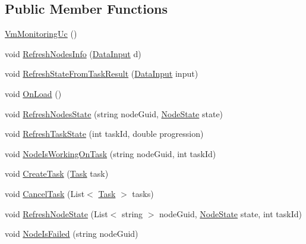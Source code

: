 \subsection*{Public Member Functions}
\begin{DoxyCompactItemize}
\item 
\hyperlink{class_node_net_1_1_g_u_i_1_1_view_model_1_1_vm_monitoring_uc_af7d7dfd28786e8cf72b26656503ae4c6}{Vm\+Monitoring\+Uc} ()
\item 
void \hyperlink{class_node_net_1_1_g_u_i_1_1_view_model_1_1_vm_monitoring_uc_aa3a412d8d562a772eb6dd09137a8b5c1}{Refresh\+Nodes\+Info} (\hyperlink{class_node_net_1_1_data_1_1_data_input}{Data\+Input} d)
\item 
void \hyperlink{class_node_net_1_1_g_u_i_1_1_view_model_1_1_vm_monitoring_uc_a72c7b887a58e93877aff75a014aca453}{Refresh\+State\+From\+Task\+Result} (\hyperlink{class_node_net_1_1_data_1_1_data_input}{Data\+Input} input)
\item 
void \hyperlink{class_node_net_1_1_g_u_i_1_1_view_model_1_1_vm_monitoring_uc_a42957d244bc7d5800bb140c6d202b43c}{On\+Load} ()
\item 
void \hyperlink{class_node_net_1_1_g_u_i_1_1_view_model_1_1_vm_monitoring_uc_a318859b0fed0360b2f0e2637c5da120f}{Refresh\+Nodes\+State} (string node\+Guid, \hyperlink{namespace_node_net_1_1_network_1_1_states_a0c130cd0043f8c509dddba2cf1fd2f36}{Node\+State} state)
\item 
void \hyperlink{class_node_net_1_1_g_u_i_1_1_view_model_1_1_vm_monitoring_uc_aa043e075e148794f53711cbd220b5b58}{Refresh\+Task\+State} (int task\+Id, double progression)
\item 
void \hyperlink{class_node_net_1_1_g_u_i_1_1_view_model_1_1_vm_monitoring_uc_aaeaab6141b8b6c041415b43ffd09ae2c}{Node\+Is\+Working\+On\+Task} (string node\+Guid, int task\+Id)
\item 
void \hyperlink{class_node_net_1_1_g_u_i_1_1_view_model_1_1_vm_monitoring_uc_a09340b4fd591a95342c1ddabe2ead196}{Create\+Task} (\hyperlink{class_node_net_1_1_tasks_1_1_task}{Task} task)
\item 
void \hyperlink{class_node_net_1_1_g_u_i_1_1_view_model_1_1_vm_monitoring_uc_ab7d0408536aeb25e1102c9a00fba105b}{Cancel\+Task} (List$<$ \hyperlink{class_node_net_1_1_tasks_1_1_task}{Task} $>$ tasks)
\item 
void \hyperlink{class_node_net_1_1_g_u_i_1_1_view_model_1_1_vm_monitoring_uc_a8bd08bfabbc3b7a9d0befe79fdf491e0}{Refresh\+Node\+State} (List$<$ string $>$ node\+Guid, \hyperlink{namespace_node_net_1_1_network_1_1_states_a0c130cd0043f8c509dddba2cf1fd2f36}{Node\+State} state, int task\+Id)
\item 
void \hyperlink{class_node_net_1_1_g_u_i_1_1_view_model_1_1_vm_monitoring_uc_a6c1da46346125ceda9151e7dbbda09f0}{Node\+Is\+Failed} (string node\+Guid)
\end{DoxyCompactItemize}

